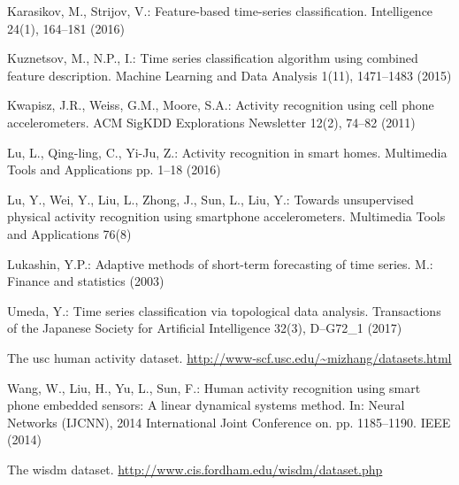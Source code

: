 \documentclass{llncs}
\begin{document}
\begin{thebibliography}{10}
	Karasikov, M., Strijov, V.: Feature-based time-series classification.
	Intelligence  24(1),  164--181 (2016)
	
	Kuznetsov, M., N.P., I.: Time series classification algorithm using combined
	feature description. Machine Learning and Data Analysis  1(11),  1471--1483
	(2015)
	
	Kwapisz, J.R., Weiss, G.M., Moore, S.A.: Activity recognition using cell phone
	accelerometers. ACM SigKDD Explorations Newsletter  12(2),  74--82 (2011)
	
	Lu, L., Qing-ling, C., Yi-Ju, Z.: Activity recognition in smart homes.
	Multimedia Tools and Applications pp. 1--18 (2016)
	
	Lu, Y., Wei, Y., Liu, L., Zhong, J., Sun, L., Liu, Y.: Towards unsupervised
	physical activity recognition using smartphone accelerometers. Multimedia
	Tools and Applications  76(8)
	
	Lukashin, Y.P.: Adaptive methods of short-term forecasting of time series. M.:
	Finance and statistics  (2003)
	
	Umeda, Y.: Time series classification via topological data analysis.
	Transactions of the Japanese Society for Artificial Intelligence  32(3),
	D--G72\_1 (2017)
	
	The usc human activity dataset.
	\url{http://www-scf.usc.edu/~mizhang/datasets.html}
	
	Wang, W., Liu, H., Yu, L., Sun, F.: Human activity recognition using smart
	phone embedded sensors: A linear dynamical systems method. In: Neural
	Networks (IJCNN), 2014 International Joint Conference on. pp. 1185--1190.
	IEEE (2014)
	
	The wisdm dataset. \url{http://www.cis.fordham.edu/wisdm/dataset.php}
	
\end{thebibliography}
\end{document}
